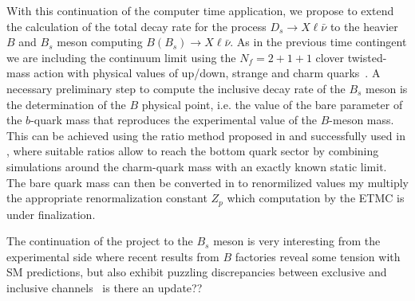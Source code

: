 With this continuation of the computer time application, we propose to extend
the calculation of the total decay rate for the process $D_s \to X\ell\bar\nu$ to the
heavier $B$ and $B_s$ meson computing  $B (B_s) \to X\ell\bar\nu$.
As in the previous time contingent we are including the continuum limit
using the $N_f=2+1+1$ clover twisted-mass action with physical
values of up/down, strange and charm
quarks~\cite{ExtendedTwistedMass:2021qui,ExtendedTwistedMass:2021gbo,ExtendedTwistedMass:2022jpw}.
A necessary preliminary step to compute the inclusive decay rate of the $B_s$
meson is the determination of the 
$B$ physical point, i.e. the value of the bare parameter of the $b$-quark mass that reproduces the
experimental value of the $B$-meson mass.  
This can be
achieved using the ratio method proposed in \cite{ETM:2009sed}
and successfully used in \cite{ETM:2016nbo}, where suitable ratios allow
to reach the bottom quark sector by combining simulations around the
charm-quark mass with an exactly known static limit.
The bare quark mass can then be converted in to renormilized values my multiply 
the appropriate renormalization constant $Z_p$ which computation by the ETMC 
is under finalization.


The continuation of the project to the $B_s$ meson is very interesting from the
experimental side  where recent results from $B$ factories reveal some tension with
SM predictions, but also exhibit puzzling discrepancies between exclusive and
inclusive channels~\cite{ParticleDataGroup:2020ssz, HFLAV:2019otj, Gambino:2019sif}
{\color{red} is there an update??}

